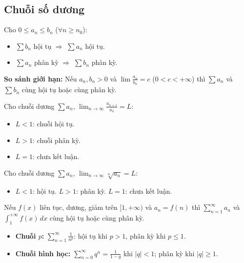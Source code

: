 \documentclass[12pt,a4paper]{article}
\begin{document}
\subsection{Chuỗi số dương}

\begin{dinhly}[title={Tiêu chuẩn so sánh}]
  Cho $0 \le a_n \le b_n$ ($\forall n \ge n_0$):
  \begin{itemize}
    \item $\sum b_n$ hội tụ $\Rightarrow$ $\sum a_n$ hội tụ.
    \item $\sum a_n$ phân kỳ $\Rightarrow$ $\sum b_n$ phân kỳ.
  \end{itemize}
  \textbf{So sánh giới hạn:} Nếu $a_n, b_n > 0$ và $\displaystyle\lim \frac{a_n}{b_n} = c$ ($0 < c < +\infty$) thì $\sum a_n$ và $\sum b_n$ cùng hội tụ hoặc cùng phân kỳ.
\end{dinhly}

\begin{dinhly}[title={Tiêu chuẩn D'Alembert (tỉ số)}]
  Cho chuỗi dương $\sum a_n$, $\displaystyle\lim_{n \to \infty} \frac{a_{n+1}}{a_n} = L$:
  \begin{itemize}
    \item $L < 1$: chuỗi hội tụ.
    \item $L > 1$: chuỗi phân kỳ.
    \item $L = 1$: chưa kết luận.
  \end{itemize}
\end{dinhly}

\begin{dinhly}[title={Tiêu chuẩn Cauchy (căn)}]
  Cho chuỗi dương $\sum a_n$, $\displaystyle\lim_{n \to \infty} \sqrt[n]{a_n} = L$:
  \begin{itemize}
    \item $L < 1$: hội tụ. \quad $L > 1$: phân kỳ. \quad $L = 1$: chưa kết luận.
  \end{itemize}
\end{dinhly}

\begin{dinhly}[title={Tiêu chuẩn tích phân (Cauchy--Maclaurin)}]
  Nếu $f(x)$ liên tục, dương, giảm trên $[1, +\infty)$ và $a_n = f(n)$ thì $\sum_{n=1}^{\infty} a_n$ và $\int_1^{+\infty} f(x)\,dx$ cùng hội tụ hoặc cùng phân kỳ.
\end{dinhly}

\begin{congthuc}[title={Chuỗi mẫu}]
  \begin{itemize}
    \item \textbf{Chuỗi $p$:} $\displaystyle\sum_{n=1}^{\infty} \frac{1}{n^p}$: hội tụ khi $p > 1$, phân kỳ khi $p \le 1$.
    \item \textbf{Chuỗi hình học:} $\displaystyle\sum_{n=0}^{\infty} q^n = \frac{1}{1-q}$ khi $|q| < 1$; phân kỳ khi $|q| \ge 1$.
  \end{itemize}
\end{congthuc}
\end{document}
